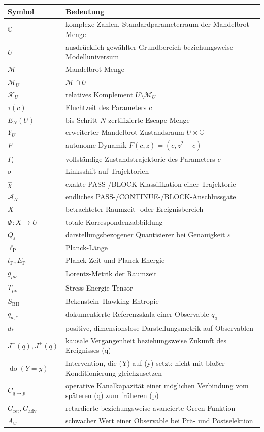 \documentclass[11pt,a4paper]{article}
\theoremstyle{remark}
\newcommand{\M}{\mathcal{M}}
\newcommand{\K}{\mathcal{K}}
\newcommand{\C}{\mathbb{C}}
\newcommand{\eps}{\varepsilon}
\begin{document}
\begin{tabularx}{\textwidth}{>{\raggedright\arraybackslash}p{}X}
\toprule
\textbf{Symbol} & \textbf{Bedeutung} \\
\midrule
\(\C\) & komplexe Zahlen, Standardparameterraum der Mandelbrot-Menge \\
\(U\) & ausdrücklich gewählter Grundbereich beziehungsweise Modelluniversum \\
\(\M\) & Mandelbrot-Menge \\
\(\M_U\) & \(\M\cap U\) \\
\(\K_U\) & relatives Komplement \(U\setminus\M_U\) \\
\(\tau(c)\) & Fluchtzeit des Parameters \(c\) \\
\(E_N(U)\) & bis Schritt \(N\) zertifizierte Escape-Menge \\
\(Y_U\) & erweiterter Mandelbrot-Zustandsraum \(U\times\C\) \\
\(F\) & autonome Dynamik \(F(c,z)=(c,z^2+c)\) \\
\(\Gamma_c\) & vollständige Zustandstrajektorie des Parameters \(c\) \\
\(\sigma\) & Linksshift auf Trajektorien \\
\(\widehat\chi\) & exakte PASS-/BLOCK-Klassifikation einer Trajektorie \\
\(\mathcal A_N\) & endliches PASS-/CONTINUE-/BLOCK-Anschlussgate \\
\(X\) & betrachteter Raumzeit- oder Ereignisbereich \\
\(\Phi:X\to U\) & totale Korrespondenzabbildung \\
\(Q_{\eps}\) & darstellungsbezogener Quantisierer bei Genauigkeit \(\eps\) \\
\(\ell_{\mathrm P}\) & Planck-Länge \\
\(t_{\mathrm P},E_{\mathrm P}\) & Planck-Zeit und Planck-Energie \\
\(g_{\mu\nu}\) & Lorentz-Metrik der Raumzeit \\
\(T_{\mu\nu}\) & Stress-Energie-Tensor \\
\(S_{\mathrm{BH}}\) & Bekenstein--Hawking-Entropie \\
\(q_{a,*}\) & dokumentierte Referenzskala einer Observable \(q_a\) \\
\(d_*\) & positive, dimensionslose Darstellungsmetrik auf Observablen \\
\(J^-(q),J^+(q)\) & kausale Vergangenheit beziehungsweise Zukunft des Ereignisses (q) \\
\(\operatorname{do}(Y=y)\) & Intervention, die (Y) auf (y) setzt; nicht mit bloßer Konditionierung gleichzusetzen \\
\(C_{q\to p}\) & operative Kanalkapazität einer möglichen Verbindung vom späteren (q) zum früheren (p) \\
\(G_{\mathrm{ret}},G_{\mathrm{adv}}\) & retardierte beziehungsweise avancierte Green-Funktion \\
\(A_w\) & schwacher Wert einer Observable bei Prä- und Postselektion \\
\bottomrule
\end{tabularx}

\begingroup
\raggedright


\endgroup
\end{document}
